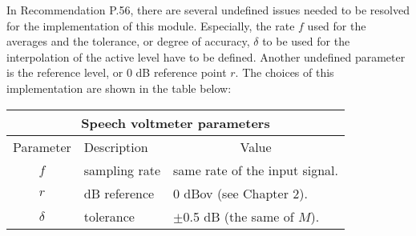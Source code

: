 In Recommendation P.56, there are several undefined issues needed to
be resolved for the implementation of this module. Especially, the
rate $f$ used for the averages and the tolerance, or degree of
accuracy, $\delta$ to be used for the interpolation of the active
level have to be defined. Another undefined parameter is the
reference level, or 0 dB reference point $r$. The choices of this
implementation are shown in the table below:
\begin{center}
\begin{tabular}{cll}
   \hline
   \multicolumn{3}{c}{\bf Speech voltmeter parameters}\\
   \hline
   \hline
   Parameter &Description &\multicolumn{1}{c}{Value}\\
   \hline
   $f$ &sampling rate &same rate of the input signal.\\
   $r$ &dB reference  &0 dBov (see Chapter 2).\\
   $\delta$ &tolerance &$\pm$0.5 dB (the same of $M$).\\
   \hline
\end{tabular}
\end{center}

